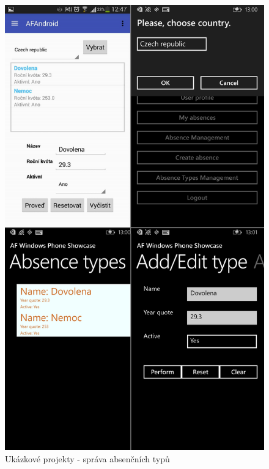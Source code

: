 \begin{figure}
\begin{center}
\includegraphics[width=\linewidth, height=\textheight, keepaspectratio]{figures/screenshots/AbsenceType}
\caption{Ukázkové projekty - správa absenčních typů}
\label{img:AbsenceType}
\end{center}
\end{figure}	

